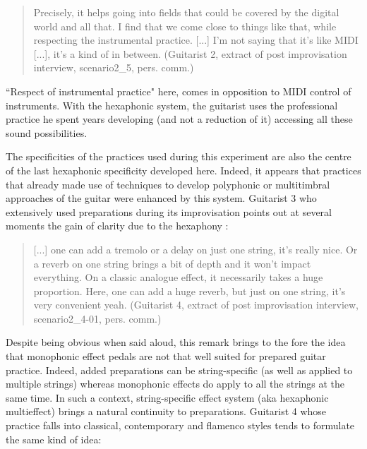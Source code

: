 \documentclass{article}
\begin{document}
\begin{quote}
Precisely, it helps going into fields that could be covered by the digital world and all that.  I find that we come close to things like that, while respecting the instrumental practice.  [...] I'm not saying that it's like MIDI [...], it's a kind of in between.  (Guitarist 2, extract of post improvisation interview, scenario2\_5, pers. comm.)
\end{quote}

``Respect of instrumental practice" here, comes in opposition to MIDI control of instruments. With the hexaphonic system, the guitarist uses the professional practice he spent years developing (and not a reduction of it) accessing all these sound possibilities.

The specificities of the practices used during this experiment are also the centre of the last hexaphonic specificity developed here. Indeed, it appears that practices that already made use of techniques to develop polyphonic or multitimbral approaches of the guitar were enhanced by this system. 
Guitarist 3 who extensively used preparations during its improvisation points out at several moments the gain of clarity due to the hexaphony : 

\begin{quote}
[...] one can add a tremolo or a delay on just one string, it's really nice. Or a reverb on one string brings a bit of depth and it won't impact everything. On a classic analogue effect, it necessarily takes a huge proportion. Here, one can add a huge reverb, but just on one string, it's very convenient yeah. (Guitarist 4, extract of post improvisation interview, scenario2\_4-01, pers. comm.)
\end{quote}

Despite being obvious when said aloud, this remark brings to the fore the idea that monophonic effect pedals are not that well suited for prepared guitar practice. Indeed, added preparations can be string-specific (as well as applied to multiple strings) whereas monophonic effects do apply to all the strings at the same time.
In such a context, string-specific effect system (aka hexaphonic multieffect) brings a natural continuity to preparations.
Guitarist 4 whose practice falls into classical, contemporary and flamenco styles tends to formulate the same kind of idea: 
\end{document}
